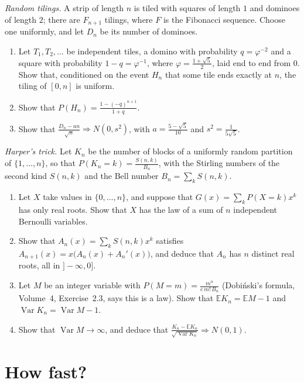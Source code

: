 \begin{exercise}[$\star\star$]\label{pb:tilings}
\emph{Random tilings.} A strip of length $n$ is tiled with squares of length $1$ and dominoes of length $2$; there are $F_{n+1}$ tilings, where $F$ is the
Fibonacci sequence. Choose one uniformly, and let $D_n$ be its number of dominoes.
\begin{enumerate}[label=(\alph*)]
\item Let $T_1,T_2,\dots$ be independent tiles, a domino with probability $q=\varphi^{-2}$ and a square with probability $1-q=\varphi^{-1}$, where
$\varphi=\frac{1+\sqrt5}2$, laid end to end from $0$. Show that, conditioned on the event $H_n$ that some tile ends exactly at $n$, the tiling of $[0,n]$ is uniform.
\item Show that $P(H_n)=\frac{1-(-q)^{n+1}}{1+q}$.
\item Show that $\frac{D_n-an}{\sqrt n}\Rightarrow N(0,s^2)$, with $a=\frac{5-\sqrt5}{10}$ and $s^2=\frac1{5\sqrt5}$.
\end{enumerate}
\end{exercise}

\begin{exercise}[$\star\star\star$]\label{pb:harper}
\emph{Harper's trick.} Let $K_n$ be the number of blocks of a uniformly random partition of $\{1,\dots,n\}$, so that $P(K_n=k)=\frac{S(n,k)}{B_n}$, with the
Stirling numbers of the second kind $S(n,k)$ and the Bell number $B_n=\sum_kS(n,k)$.
\begin{enumerate}[label=(\alph*)]
\item Let $X$ take values in $\{0,\dots,n\}$, and suppose that $G(x)=\sum_kP(X=k)x^k$ has only real roots. Show that $X$ has the law of a sum of
$n$ independent Bernoulli variables.
\item Show that $A_n(x)=\sum_kS(n,k)x^k$ satisfies $A_{n+1}(x)=x\bigl(A_n(x)+A_n'(x)\bigr)$, and deduce that $A_n$ has $n$ distinct real roots, all in $]-\infty,0]$.
\item Let $M$ be an integer variable with $P(M=m)=\frac{m^n}{e\,m!\,B_n}$ (Dobi\'nski's formula, Volume~4, Exercise~2.3, says this is a law). Show that
$\mathbb EK_n=\mathbb EM-1$ and $\operatorname{Var}K_n=\operatorname{Var}M-1$.
\item Show that $\operatorname{Var}M\to\infty$, and deduce that $\frac{K_n-\mathbb EK_n}{\sqrt{\operatorname{Var}K_n}}\Rightarrow N(0,1)$.
\end{enumerate}
\end{exercise}

\section{How fast?}

